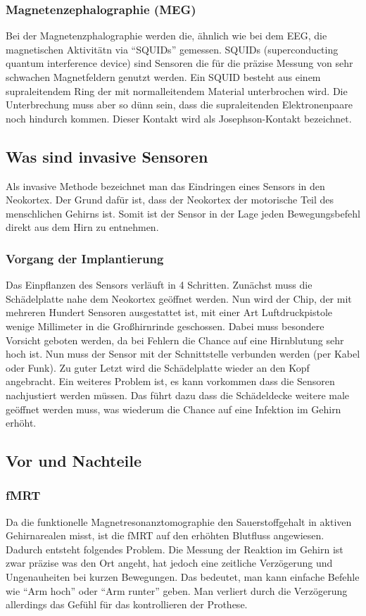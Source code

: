 \documentclass[11pt,ngerman,parskip=half]{scrartcl}
\begin{document}
\subsubsection{Magnetenzephalographie (MEG)}
Bei der Magnetenzphalographie werden die, ähnlich wie bei dem EEG, die
magnetischen Aktivitätn via \enquote{SQUIDs} gemessen. SQUIDs
(superconducting quantum interference device) sind Sensoren die für die
präzise Messung von sehr schwachen Magnetfeldern genutzt werden. Ein SQUID
besteht aus einem supraleitendem Ring der mit normalleitendem Material
unterbrochen wird. Die Unterbrechung muss aber so dünn sein, dass die
supraleitenden Elektronenpaare noch hindurch kommen. Dieser Kontakt wird als
Josephson-Kontakt bezeichnet.
\parencite{meg}

\subsection{Was sind invasive Sensoren}
Als invasive Methode bezeichnet man das Eindringen eines Sensors in den
Neokortex. Der Grund dafür ist, dass der Neokortex der motorische Teil des
menschlichen Gehirns ist. Somit ist der Sensor in der Lage jeden
Bewegungsbefehl direkt aus dem Hirn zu entnehmen.
\parencites{bciuinvasiv}{methoden}

\subsubsection{Vorgang der Implantierung}
Das Einpflanzen des Sensors verläuft in 4 Schritten. Zunächst muss die
Schädelplatte nahe dem Neokortex geöffnet werden. Nun wird der Chip, der mit
mehreren Hundert Sensoren ausgestattet ist, mit einer Art Luftdruckpistole
wenige Millimeter in die Großhirnrinde geschossen. Dabei muss besondere
Vorsicht geboten werden, da bei Fehlern die Chance auf eine Hirnblutung sehr
hoch ist. Nun muss der Sensor mit der Schnittstelle verbunden werden (per
Kabel oder Funk). Zu guter Letzt wird die Schädelplatte wieder an den Kopf
angebracht. Ein weiteres Problem ist, es kann vorkommen dass die Sensoren
nachjustiert werden müssen. Das führt dazu dass die Schädeldecke weitere male
geöffnet werden muss, was wiederum die Chance auf eine Infektion im Gehirn
erhöht.\cite{bciuinvasiv}

\subsection{Vor und Nachteile}  
\subsubsection{fMRT}
Da die funktionelle Magnetresonanztomographie den Sauerstoffgehalt in aktiven
Gehirnarealen misst, ist die fMRT auf den erhöhten Blutfluss angewiesen.
Dadurch entsteht folgendes Problem. Die Messung der Reaktion im Gehirn ist
zwar präzise was den Ort angeht, hat jedoch eine zeitliche Verzögerung und
Ungenauheiten bei kurzen Bewegungen. Das bedeutet, man kann einfache Befehle
wie \enquote{Arm hoch} oder \enquote{Arm runter} geben. Man verliert durch
die Verzögerung allerdings das Gefühl für das kontrollieren der Prothese.
\end{document}
